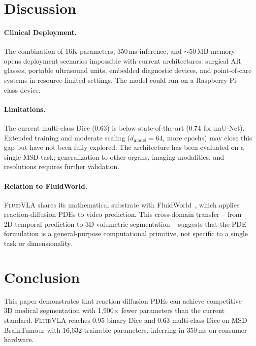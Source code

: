 \documentclass{article}
\newcommand{\fluidvla}{\textsc{FluidVLA}}
\begin{document}
\section{Discussion}
\label{sec:discussion}

\paragraph{Clinical Deployment.}
The combination of 16K parameters, 350\,ms inference, and $\sim$50\,MB memory opens deployment scenarios impossible with current architectures: surgical AR glasses, portable ultrasound units, embedded diagnostic devices, and point-of-care systems in resource-limited settings. The model could run on a Raspberry Pi-class device.

\paragraph{Limitations.}
The current multi-class Dice (0.63) is below state-of-the-art (0.74 for nnU-Net). Extended training and moderate scaling ($d_\text{model}=64$, more epochs) may close this gap but have not been fully explored. The architecture has been evaluated on a single MSD task; generalization to other organs, imaging modalities, and resolutions requires further validation.

\paragraph{Relation to FluidWorld.}
\fluidvla{} shares its mathematical substrate with FluidWorld~\cite{polly2026fluidworld}, which applies reaction-diffusion PDEs to video prediction. This cross-domain transfer -- from 2D temporal prediction to 3D volumetric segmentation -- suggests that the PDE formulation is a general-purpose computational primitive, not specific to a single task or dimensionality.

\section{Conclusion}
\label{sec:conclusion}

This paper demonstrates that reaction-diffusion PDEs can achieve competitive 3D medical segmentation with 1,900$\times$ fewer parameters than the current standard. \fluidvla{} reaches 0.95 binary Dice and 0.63 multi-class Dice on MSD BrainTumour with 16,632 trainable parameters, inferring in 350\,ms on consumer hardware.
\end{document}

